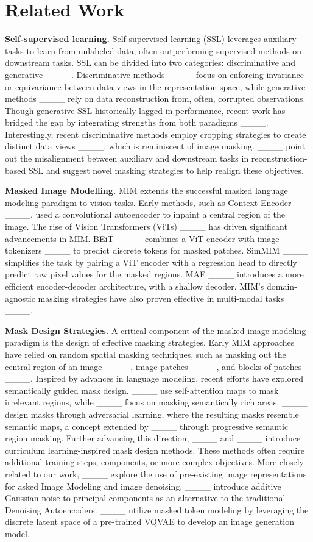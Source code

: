 \section{Related Work}
\textbf{Self-supervised learning.} 
Self-supervised learning (SSL) leverages auxiliary tasks to learn from unlabeled data, often outperforming supervised methods on downstream tasks. SSL can be divided into two categories: discriminative and generative ____. Discriminative methods ____ focus on enforcing invariance or equivariance between data views in the representation space, while generative methods ____ rely on data reconstruction from, often, corrupted observations. Though generative SSL historically lagged in performance, recent work has bridged the gap by integrating strengths from both paradigms ____. Interestingly, recent discriminative methods employ cropping strategies to create distinct data views ____, which is reminiscent of image masking. ____ point out the misalignment between auxiliary and downstream tasks in reconstruction-based SSL and suggest novel masking strategies to help realign these objectives.

\textbf{Masked Image Modelling.}  MIM extends the successful masked language modeling paradigm to vision tasks. Early methods, such as Context Encoder ____, used a convolutional autoencoder to inpaint a central region of the image. The rise of Vision Transformers (ViTs) ____ has driven significant advancements in MIM. BEiT ____ combines a ViT encoder with image tokenizers ____ to predict discrete tokens for masked patches. SimMIM ____ simplifies the task by pairing a ViT encoder with a regression head to directly predict raw pixel values for the masked regions. MAE ____ introduces a more efficient encoder-decoder architecture, with a shallow decoder. MIM’s domain-agnostic masking strategies have also proven effective in multi-modal tasks ____.

\textbf{Mask Design Strategies.}  A critical component of the masked image modeling paradigm is the design of effective masking strategies. Early MIM approaches have relied on random spatial masking techniques, such as masking out the central region of an image ____, image patches ____, and blocks of patches ____. Inspired by advances in language modeling, recent efforts have explored semantically guided mask design. ____ use self-attention maps to mask irrelevant regions, while ____ focus on masking semantically rich areas. ____ design masks through adversarial learning, where the resulting masks resemble semantic maps, a concept extended by ____ through progressive semantic region masking. Further advancing this direction, ____ and ____ introduce curriculum learning-inspired mask design methods. %
These methods often require additional training steps, components, or more complex objectives. More closely related to our work, ____ explore the use of pre-existing image representations for asked Image Modeling and image denoising. ____ introduce additive Gaussian noise to principal components as an alternative to the traditional Denoising Autoencoders. ____ utilize masked token modeling by leveraging the discrete latent space of a pre-trained VQVAE to develop an image generation model.